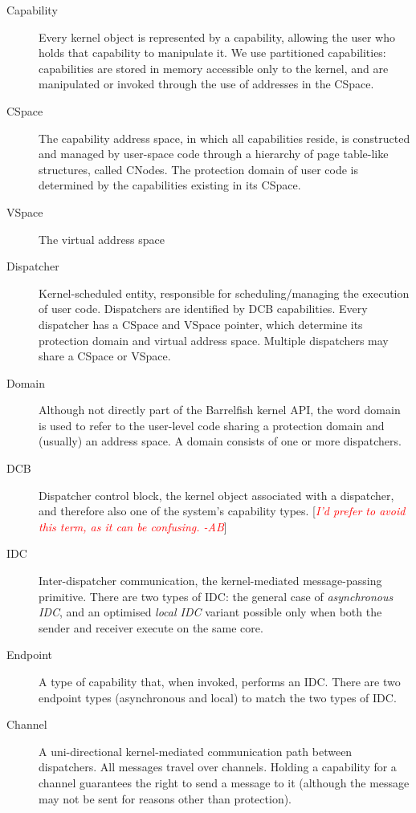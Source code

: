 \documentclass[a4paper,11pt,twoside]{report}
\newcommand{\todo}[1]{[\textcolor{red}{\emph{#1}}]}
\begin{document}
\begin{description}
\item[Capability] Every kernel object is represented by a capability,
allowing the user who holds that capability to manipulate it. We use
partitioned capabilities: capabilities are stored in memory accessible only
to the kernel, and are manipulated or invoked through the use of addresses
in the CSpace.

\item[CSpace] The capability address space, in which all capabilities reside,
is constructed and managed by user-space code through a hierarchy of page
table-like structures, called CNodes. The protection domain of user code
is determined by the capabilities existing in its CSpace.

\item[VSpace] The virtual address space

\item[Dispatcher] Kernel-scheduled entity, responsible for
scheduling/managing the execution of user code. Dispatchers are identified
by DCB capabilities. Every dispatcher has a CSpace and VSpace pointer,
which determine its protection domain and virtual address space. Multiple
dispatchers may share a CSpace or VSpace.

\item[Domain] Although not directly part of the Barrelfish kernel API, the
word domain is used to refer to the user-level code sharing a protection
domain and (usually) an address space. A domain consists of one or more
dispatchers.

\item[DCB] Dispatcher control block, the kernel object associated with
a dispatcher, and therefore also one of the system's capability types.
\todo{I'd prefer to avoid this term, as it can be confusing. -AB}

\item[IDC] Inter-dispatcher communication, the kernel-mediated message-passing
primitive. There are two types of IDC: the general case of
\emph{asynchronous IDC}, and an optimised \emph{local IDC} variant possible
only when both the sender and receiver execute on the same core.

\item[Endpoint] A type of capability that, when invoked, performs an IDC.
There are two endpoint types (asynchronous and local) to match the two
types of IDC.

\item[Channel] A uni-directional kernel-mediated communication path
between dispatchers. All messages travel over channels. Holding a
capability for a channel guarantees the right to send a message to it
(although the message may not be sent for reasons other than
protection).


\end{description}
\end{document}
